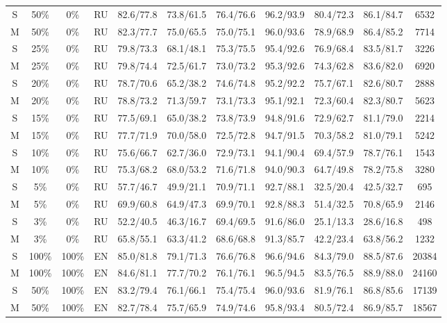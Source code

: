 \begin{table*}
{\begin{tabular}{|c|c|c|c||c|c|c|c|c|c||c|}
S & 50\% & 0\% & RU & 82.6/77.8 & 73.8/61.5 & 76.4/76.6 & 96.2/93.9 & 80.4/72.3 & 86.1/84.7 & 6532 \\
M & 50\% & 0\% & RU & 82.3/77.7 & 75.0/65.5 & 75.0/75.1 & 96.0/93.6 & 78.9/68.9 & 86.4/85.2 & 7714 \\ \hline
S & 25\% & 0\% & RU & 79.8/73.3 & 68.1/48.1 & 75.3/75.5 & 95.4/92.6 & 76.9/68.4 & 83.5/81.7 & 3226 \\ 
M & 25\% & 0\% & RU & 79.8/74.4 & 72.5/61.7 & 73.0/73.2 & 95.3/92.6 & 74.3/62.8 & 83.6/82.0 & 6920 \\ \hline
S & 20\% & 0\% & RU & 78.7/70.6 & 65.2/38.2 & 74.6/74.8 & 95.2/92.2 & 75.7/67.1 & 82.6/80.7 & 2888 \\ 
M & 20\% & 0\% & RU & 78.8/73.2 & 71.3/59.7 & 73.1/73.3 & 95.1/92.1 & 72.3/60.4 & 82.3/80.7 & 5623 \\ \hline
S & 15\% & 0\% & RU & 77.5/69.1 & 65.0/38.2 & 73.8/73.9 & 94.8/91.6 & 72.9/62.7 & 81.1/79.0 & 2214 \\ 
M & 15\% & 0\% & RU & 77.7/71.9 & 70.0/58.0 & 72.5/72.8 & 94.7/91.5 & 70.3/58.2 & 81.0/79.1 & 5242 \\ \hline
S & 10\% & 0\% & RU & 75.6/66.7 & 62.7/36.0 & 72.9/73.1 & 94.1/90.4 & 69.4/57.9 & 78.7/76.1 & 1543 \\ 
M & 10\% & 0\% & RU & 75.3/68.2 & 68.0/53.2 & 71.6/71.8 & 94.0/90.3 & 64.7/49.8 & 78.2/75.8 & 3280 \\ \hline
S & 5\% & 0\% & RU & 57.7/46.7 & 49.9/21.1 & 70.9/71.1 & 92.7/88.1 & 32.5/20.4 & 42.5/32.7 & 695 \\ 
M & 5\% & 0\% & RU & 69.9/60.8 & 64.9/47.3 & 69.9/70.1 & 92.8/88.3 & 51.4/32.5 & 70.8/65.9 & 2146 \\ \hline
S & 3\% & 0\% & RU & 52.2/40.5 & 46.3/16.7 & 69.4/69.5 & 91.6/86.0 & 25.1/13.3 & 28.6/16.8 & 498 \\
M & 3\% & 0\% & RU & 65.8/55.1 & 63.3/41.2 & 68.6/68.8 & 91.3/85.7 & 42.2/23.4 & 63.8/56.2 & 1232 \\ \hline
S  &  100\%  &  100\%  &  EN  & 85.0/81.8 & 79.1/71.3 & 76.6/76.8 & 96.6/94.6 & 84.3/79.0 & 88.5/87.6 & 20384 \\
 M  &  100\%  &  100\%  &  EN  & 84.6/81.1 & 77.7/70.2 & 76.1/76.1 & 96.5/94.5 & 83.5/76.5 & 88.9/88.0 & 24160 \\ \hline
 S  &  50\%  &  100\%  &  EN  & 83.2/79.4 & 76.1/66.1 & 75.4/75.4 & 96.0/93.6 & 81.9/76.1 & 86.8/85.6 & 17139 \\ 
 M  &  50\%  &  100\%  &  EN  & 82.7/78.4 & 75.7/65.9 & 74.9/74.6 & 95.8/93.4 & 80.5/72.4 & 86.9/85.7 & 18567 \\ \hline

\end{tabular}}
\end{table*}
